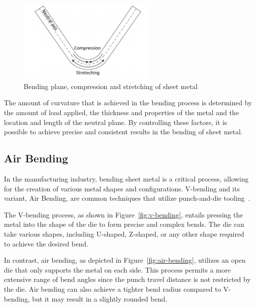 \begin{figure}[h]
    \begin{tcolorbox}[arc=0pt,boxrule=0.5pt, colback=white]
        \centering
        \includegraphics[width=0.6\textwidth]{chap2/images/neutral-plane}
    \end{tcolorbox}
    \caption{Bending plane, compression and stretching of sheet
    metal~\cite[p. 3]{baig_machinelearningprediction_2021}}
    \label{fig:neutral-plane}
\end{figure}

The amount of curvature that is achieved in the bending process is determined by the
amount of load applied, the thickness and properties of the metal and the location and length of the neutral plane.
By controlling these factors, it is possible to achieve precise and consistent results in the bending of sheet metal.

\subsection{Air Bending}\label{subsec:air-bending}
In the manufacturing industry, bending sheet metal is a critical process, allowing for the creation of various metal
shapes and configurations.
V-bending and its variant, Air Bending, are common techniques that utilize punch-and-die
tooling~\cite[p. 416]{groover_fundamentalsmodernmanufacturing_2020}.

The V-bending process, as shown in Figure~\ref{fig:v-bending}, entails pressing the metal into the shape of the die
to form precise and complex bends.
The die can take various shapes, including U-shaped, Z-shaped, or any other shape required to achieve the desired bend.

In contrast, air bending, as depicted in Figure~\ref{fig:air-bending}, utilizes an open die that only supports the
metal on each side.
This process permits a more extensive range of bend angles since the punch travel distance is not
restricted by the die.
Air bending can also achieve a tighter bend radius compared to V-bending, but it may result in
a slightly rounded bend.

